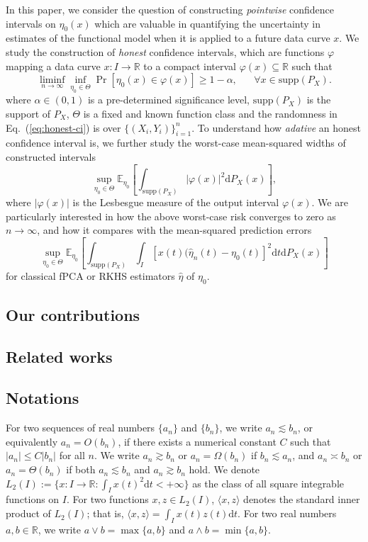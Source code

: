 \documentclass[11pt,a4paper]{article}
\renewcommand{\hat}{\widehat}
\theoremstyle{definition}
\theoremstyle{plain}
\theoremstyle{remark}
\newcommand{\supp}{\mathrm{supp}}
\newcommand{\ud}{\mathrm d}
\begin{document}
In this paper, we consider the question of constructing \emph{pointwise} confidence intervals on $\eta_0(x)$ which are valuable in quantifying the uncertainty in estimates of the functional model
when it is applied to a future data curve $x$. We study the construction of \emph{honest} confidence intervals, which are functions $\varphi$ mapping a data curve $x:I\to\mathbb R$ to a compact interval $\varphi(x)\subseteq\mathbb R$
such that
\begin{equation}
\liminf_{n\to\infty}\inf_{\eta_0\in\Theta} \Pr\left[\eta_0(x)\in\varphi(x)\right] \geq 1-\alpha,\;\;\;\;\;\;\forall x\in\mathrm{supp}(P_X).
\label{eq:honest-ci}
\end{equation}
where $\alpha\in(0,1)$ is a pre-determined significance level,
$\supp(P_X)$ is the support of $P_X$, $\Theta$ is a fixed and known function class and the randomness in Eq.~(\ref{eq:honest-ci}) is over $\{(X_i,Y_i)\}_{i=1}^n$.
To understand how \emph{adative} an honest confidence interval is, we further study the worst-case mean-squared widths of constructed intervals
\begin{equation}
\sup_{\eta_0\in\Theta}\mathbb E_{\eta_0} \left[\int_{\supp(P_X)}\big|\varphi(x)\big|^2\ud P_X(x)\right],
\label{eq:adaptive}
\end{equation}
where $|\varphi(x)|$ is the Lesbesgue measure of the output interval $\varphi(x)$. We are particularly interested in how the above worst-case risk converges to zero as $n\to\infty$,
and how it compares with the mean-squared prediction errors
$$
\sup_{\eta_0\in\Theta}\mathbb E_{\eta_0} \left[\int_{\supp(P_X)}\int_I [x(t)(\hat\eta_n(t)-\eta_0(t)]^2\ud t\ud P_X(x)\right]
$$
for classical fPCA or RKHS estimators $\hat\eta$ of $\eta_0$.

\subsection{Our contributions}

\subsection{Related works}

\subsection{Notations}

For two sequences of real numbers $\{a_n\}$ and $\{b_n\}$, we write $a_n\lesssim b_n$, or equivalently $a_n=O(b_n)$, if there exists a numerical constant $C$ such that $|a_n|\leq C|b_n|$ for all $n$.
We write $a_n\gtrsim b_n$ or $a_n=\Omega(b_n)$ if $b_n\lesssim a_n$, and $a_n\asymp b_n$ or $a_n=\Theta(b_n)$ if both $a_n\lesssim b_n$ and $a_n\gtrsim b_n$ hold.
We denote $L_2(I):=\{x: I\to\mathbb R: \int_I x(t)^2\ud t<+\infty\}$ as the class of all square integrable functions on $I$.
For two functions $x,z\in L_2(I)$, $\langle x,z\rangle$ denotes the standard inner product of $L_2(I)$; that is, $\langle x,z\rangle = \int_I x(t)z(t)\ud t$.
For two real numbers $a,b\in\mathbb R$, we write $a\vee b=\max\{a,b\}$ and $a\wedge b=\min\{a,b\}$.
\end{document}
